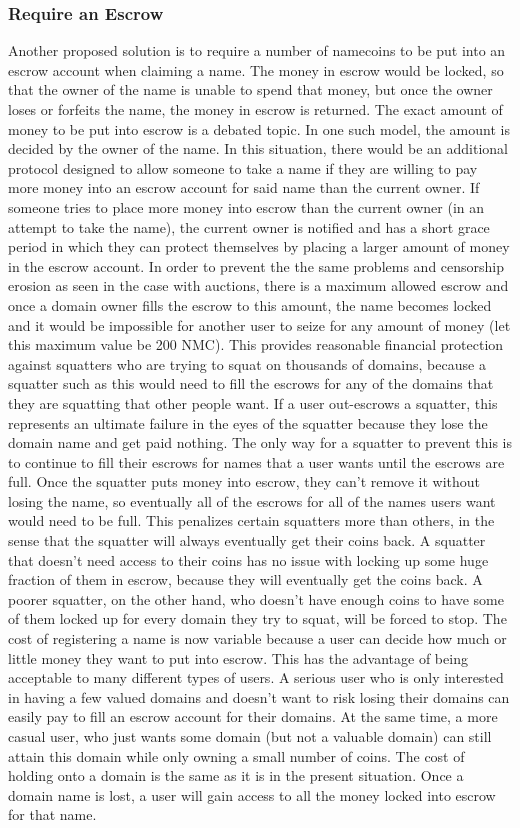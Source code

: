 \subsubsection{Require an Escrow}
    Another proposed solution is to require a number of namecoins to be put into an escrow account when claiming a name. The money in escrow would be locked, so that the owner of the name is unable to spend that money, but once the owner loses or forfeits the name, the money in escrow is returned. The exact amount of money to be put into escrow is a debated topic. In one such model, the amount is decided by the owner of the name. In this situation, there would be an additional protocol designed to allow someone to take a name if they are willing to pay more money into an escrow account for said name than the current owner. If someone tries to place more money into escrow than the current owner (in an attempt to take the name), the current owner is notified and has a short grace period in which they can protect themselves by placing a larger amount of money in the escrow account. In order to prevent the the same problems and censorship erosion as seen in the case with auctions, there is a maximum allowed escrow and once a domain owner fills the escrow to this amount, the name becomes locked and it would be impossible for another user to seize for any amount of money (let this maximum value be 200 NMC). This provides reasonable financial protection against squatters who are trying to squat on thousands of domains, because a squatter such as this would need to fill the escrows for any of the domains that they are squatting that other people want. If a user out-escrows a squatter, this represents an ultimate failure in the eyes of the squatter because they lose the domain name and get paid nothing. The only way for a squatter to prevent this is to continue to fill their escrows for names that a user wants until the escrows are full. Once the squatter puts money into escrow, they can't remove it without losing the name, so eventually all of the escrows for all of the names users want would need to be full. This penalizes certain squatters more than others, in the sense that the squatter will always eventually get their coins back. A squatter that doesn't need access to their coins has no issue with locking up some huge fraction of them in escrow, because they will eventually get the coins back. A poorer squatter, on the other hand, who doesn't have enough coins to have some of them locked up for every domain they try to squat, will be forced to stop. 
    The cost of registering a name is now variable because a user can decide how much or little money they want to put into escrow. This has the advantage of being acceptable to many different types of users. A serious user who is only interested in having a few valued domains and doesn't want to risk losing their domains can easily pay to fill an escrow account for their domains. At the same time, a more casual user, who just wants some domain (but not a valuable domain) can still attain this domain while only owning a small number of coins. The cost of holding onto a domain is the same as it is in the present situation. Once a domain name is lost, a user will gain access to all the money locked into escrow for that name.     

